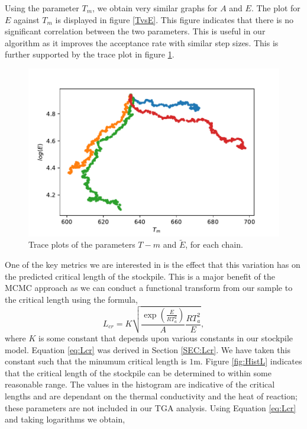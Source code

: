 Using the parameter $T_m$, we obtain very similar graphs for $A$ and $E$. The plot for $E$ against $T_m$ is displayed in figure \ref{TvsE}. This figure indicates that there is no significant correlation between the two parameters. This is useful in our algorithm as it improves the acceptance rate with similar step sizes. This is further supported by the trace plot in figure \ref{fig:trace2}.\\
\begin{figure}[h!]
\centering
\includegraphics[width=\linewidth]{figures/bayesian/Tm/trace_plots.pdf}
\caption{Trace plots of the parameters $T-m$ and $\tilde{E}$, for each chain.}
\label{fig:trace2}
\end{figure}
One of the key metrics we are interested in is the effect that this variation has on the predicted critical length of the stockpile. This is a major benefit of the MCMC approach as we can conduct a functional transform from our sample to the critical length using the formula,
\begin{equation}
L_{cr}=K \sqrt{\frac{\exp\left(\frac{E}{RT_a^2}\right)}{A}\frac{RT_a^2}{E}},
\label{eq:Lcr}
\end{equation}
where $K$ is some constant that depends upon various constants in our stockpile model. Equation \ref{eq:Lcr} was derived in Section \ref{SEC:Lcr}. We have taken this constant such that the minumum critical length is $1$m.
Figure \ref{fig:HistL} indicates that the critical length of the stockpile can be determined to within some reasonable range. The values in the histogram are indicative of the critical lengths and are dependant on the thermal conductivity and the heat of reaction; these parameters are not included in our TGA analysis. Using Equation \ref{eq:Lcr} and taking logarithms we obtain,
